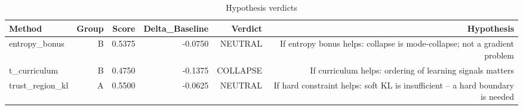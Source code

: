 \begin{table}[htbp]
\centering
\caption{Hypothesis verdicts}
\label{tab:hyp-verdicts}
\begin{tabular}{lrrrrr}
\toprule
\textbf{Method} & \textbf{Group} & \textbf{Score} & \textbf{Delta\_Baseline} & \textbf{Verdict} & \textbf{Hypothesis} \\
\midrule
entropy\_bonus & B & 0.5375 & -0.0750 & NEUTRAL & If entropy bonus helps: collapse is mode-collapse; not a gradient problem \\
t\_curriculum & B & 0.4750 & -0.1375 & COLLAPSE & If curriculum helps: ordering of learning signals matters \\
trust\_region\_kl & A & 0.5500 & -0.0625 & NEUTRAL & If hard constraint helps: soft KL is insufficient -- a hard boundary is needed \\
\bottomrule
\end{tabular}
\end{table}